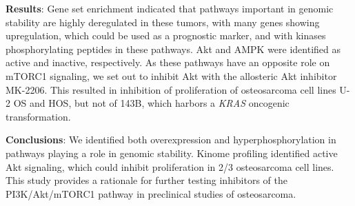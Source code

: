 \textbf{Results}: Gene set enrichment indicated that pathways important in genomic stability are highly deregulated in these tumors, with many genes showing upregulation, which could be used as a prognostic marker, and with kinases phosphorylating peptides in these pathways. Akt and AMPK were identified as active and inactive, respectively. As these pathways have an opposite role on mTORC1 signaling, we set out to inhibit Akt with the allosteric Akt inhibitor MK-2206. This resulted in inhibition of proliferation of osteosarcoma cell lines U-2 OS and HOS, but not of 143B, which harbors a {\it KRAS} oncogenic transformation.

\textbf{Conclusions}: We identified both overexpression and hyperphosphorylation in pathways playing a role in genomic stability. Kinome profiling identified active Akt signaling, which could inhibit proliferation in 2/3 osteosarcoma cell lines. This study provides a rationale for further testing inhibitors of the PI3K/Akt/mTORC1 pathway in preclinical studies of osteosarcoma.

